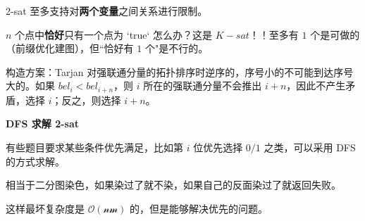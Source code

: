 2-sat 至多支持对\textbf{两个变量}之间关系进行限制。

$n$ 个点中\textbf{恰好}只有一个点为 `true` 怎么办？这是 $K-sat$！！至多有 $1$ 个是可做的（前缀优化建图），但“恰好有 $1$ 个"是不行的。

构造方案：Tarjan 对强联通分量的拓扑排序时逆序的，序号小的不可能到达序号大的。如果 $bel_i<bel_{i+n}$，则 $i$ 所在的强联通分量不会推出 $i+n$，因此不产生矛盾，选择 $i$；反之，则选择 $i+n$。

\textbf{DFS 求解 2-sat}

有些题目要求某些条件优先满足，比如第 $i$ 位优先选择 $0/1$ 之类，可以采用 DFS 的方式求解。

相当于二分图染色，如果染过了就不染，如果自己的反面染过了就返回失败。

这样最坏复杂度是 $\mathcal{O(nm)}$ 的，但是能够解决优先的问题。